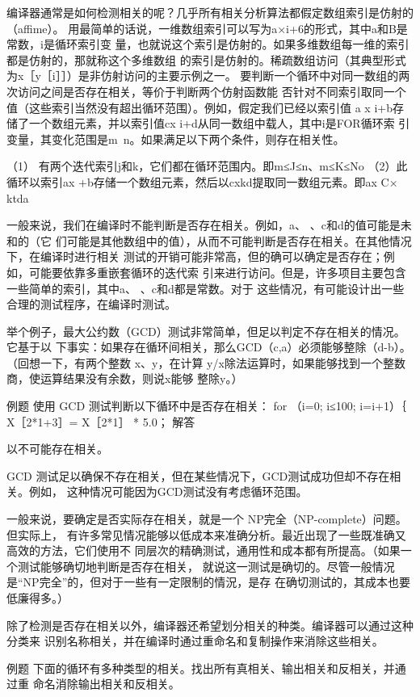 编译器通常是如何检测相关的呢？几乎所有相关分析算法都假定数组索引是仿射的（affime）。
用最简单的话说，一维数组索引可以写为a×i+6的形式，其中a和B是常数，i是循环索引变
量，也就说这个索引是仿射的。如果多维数组每一维的索引都是仿射的，那就称这个多维数组
的索引是仿射的。稀疏数组访问（其典型形式为x［y［i］］）是非仿射访问的主要示例之一。
要判断一个循环中对同一数组的两次访问之间是否存在相关，等价于判断两个仿射函数能
否针对不同索引取同一个值（这些索引当然没有超出循环范围）。例如，假定我们已经以索引值
a x i+b存储了一个数组元素，并以索引值cx i+d从同一数组中载人，其中i是FOR循环索
引变量，其变化范围是m~n。如果满足以下两个条件，则存在相关性。

（1） 有两个迭代索引j和k，它们都在循环范围内。即m≤J≤n、m≤K≤No
（2）此循环以索引ax +b存储一个数组元素，然后以cxkd提取同一数组元素。即ax C×
ktda

一般来说，我们在编译时不能判断是否存在相关。例如，a、 、c和d的值可能是未和的（它
们可能是其他数组中的值），从而不可能判断是否存在相关。在其他情况下，在编译时进行相关
测试的开销可能非常高，但的确可以确定是否存在；例如，可能要依靠多重嵌套循环的迭代索
引来进行访问。但是，许多项目主要包含一些简单的索引，其中a、 、c和d都是常数。对于
这些情况，有可能设计出一些合理的测试程序，在编译时测试。

举个例子，最大公约数（GCD）测试非常简单，但足以判定不存在相关的情况。它基于以
下事实：如果存在循环间相关，那么GCD（c,a）必须能够整除（d-b）。（回想一下，有两个整数
x、y，在计算 y/x除法运算时，如果能够找到一个整数商，使运算结果没有余数，则说x能够
整除y。）

例题
使用 GCD 测试判断以下循环中是否存在相关：
for （i=0; i≤100; i=i+1）｛
X［2*1+3］= X［2*1］ * 5.0；
解答

以不可能存在相关。

GCD 测试足以确保不存在相关，但在某些情况下，GCD测试成功但却不存在相关。例如，
这种情况可能因为GCD测试没有考虑循环范围。

一般来说，要确定是否实际存在相关，就是一个 NP完全（NP-complete）问题。但实际上，
有许多常见情况能够以低成本来准确分析。最近出现了一些既准确又高效的方法，它们使用不
同层次的精确测试，通用性和成本都有所提高。（如果一个测试能够确切地判断是否存在相关，
就说这一测试是确切的。尽管一般情况是“NP完全”的，但对于一些有一定限制的情況，是存
在确切测试的，其成本也要低廉得多。）

除了检测是否存在相关以外，编译器还希望划分相关的种类。编译器可以通过这种分类来
识别名称相关，并在编译时通过重命名和复制操作来消除这些相关。

例题
下面的循环有多种类型的相关。找出所有真相关、输出相关和反相关，并通过重
命名消除输出相关和反相关。

